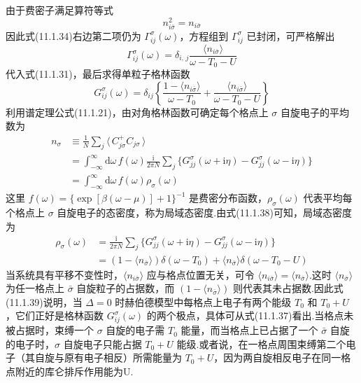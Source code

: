 由于费密子满足算符等式
\begin{equation}
  n^{2}_{i\bar{\sigma}}=n_{i\bar{\sigma}}
\end{equation}
因此式(11.1.34)右边第二项仍为 $\Gamma^{\sigma}_{ij}(\omega)$，方程组到 $\Gamma^{\sigma}_{ij}$ 已封闭，可严格解出
\begin{equation}
  \Gamma^{\sigma}_{ij}(\omega)
  =\delta_{i,\,j}\frac{\langle n_{i\bar{\sigma}}\rangle}{\omega-T_{0}-U}
\end{equation}
代入式(11.1.31)，最后求得单粒子格林函数
\begin{equation}
  G^{\sigma}_{ij}(\omega)=\delta_{ij}
  \left\{\frac{1-\langle n_{i\bar{\sigma}}\rangle}{\omega-T_{0}}
  +\frac{\langle n_{i\bar{\sigma}}\rangle}{\omega-T_{0}-U}\right\}
\end{equation}
利用谱定理公式(11.1.21)，由对角格林函数可确定每个格点上 $\sigma$ 自旋电子的平均数为
\begin{equation}
\begin{aligned}
  n_{\sigma}&\equiv\frac{1}{N}\sum_{j}
  \langle\,C^{+}_{j\sigma}C_{j\sigma}\,\rangle\\
  &=\int_{-\infty}^{\infty}\mathrm{d}\omega\,f(\omega)
  \frac{\mathrm{i}}{2\pi N}\sum_{j}
  \bigl\{G^{\sigma}_{jj}(\omega+\mathrm{i}\eta)
  -G^{\sigma}_{jj}(\omega-\mathrm{i}\eta)\bigr\}\\
  &=\int_{-\infty}^{\infty}\mathrm{d}\omega\,f(\omega)\rho_{\sigma}(\omega)
\end{aligned}
\end{equation}
这里 $f(\omega)=\{\exp[\beta(\omega-\mu)]+1\}^{-1}$ 是费密分布函数，$\rho_{\sigma}(\omega)$ 代表平均每个格点上 $\sigma$ 自旋电子的态密度，称为局域态密度.由式(11.1.38)可知，局域态密度为
\begin{equation}
\begin{aligned}
  \rho_{\sigma}(\omega)&=\frac{\mathrm{i}}{2\pi N}\sum_{j}
  \bigl\{G^{\sigma}_{jj}(\omega+\mathrm{i}\eta)
  -G^{\sigma}_{jj}(\omega-\mathrm{i}\eta)\bigr\}\\
  &=(1-\langle n_{\bar{\sigma}}\rangle)\delta(\omega-T_{0})
  +\langle n_{\bar{\sigma}}\rangle\delta(\omega-T_{0}-U)
\end{aligned}
\end{equation}
当系统具有平移不变性时，$\langle n_{i\bar{\sigma}}\rangle$ 应与格点位置无关，可令 $\langle n_{i\bar{\sigma}}\rangle=\langle n_{\bar{\sigma}}\rangle$.这时 $\langle n_{\bar{\sigma}}\rangle$ 为任一格点上 $\bar{\sigma}$ 自旋粒子的占据数，而 $(1-\langle n_{\bar{\sigma}}\rangle)$ 则代表其未占据数.因此式(11.1.39)说明，当 $\Delta=0$ 时赫伯德模型中每格点上电子有两个能级 $T_{0}$ 和 $T_{0}+U$，它们正好是格林函数 $G^{\sigma}_{ij}(\omega)$ 的两个极点，具体可从式(11.1.37)看出.当格点未被占据时，束缚一个 $\sigma$ 自旋的电子需 $T_{0}$ 能量，而当格点上已占据了一个 $\bar{\sigma}$ 自旋的电子时，$\sigma$ 自旋电子只能占据 $T_{0}+U$ 能级.或者说，在一格点周围束缚第二个电子（其自旋与原有电子相反）所需能量为 $T_{0}+U$，因为两自旋相反电子在同一格点附近的库仑排斥作用能为U.

